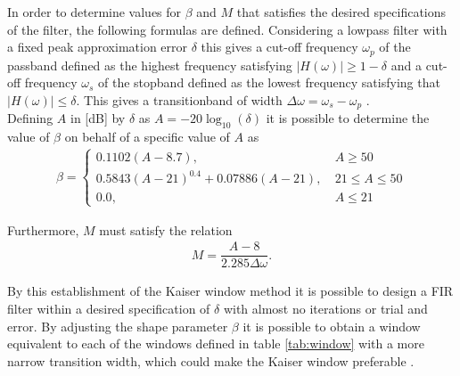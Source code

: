 In order to determine values for $\beta$ and $M$ that satisfies the desired specifications of the filter, the following formulas are defined. Considering a lowpass filter with a fixed peak approximation error $\delta$ this gives a cut-off frequency $\omega_p$ of the passband defined as the highest frequency satisfying $|H(\omega)| \geq 1-\delta$ and a cut-off frequency $\omega_s$ of the stopband defined as the lowest frequency satisfying that $|H(\omega)| \leq \delta$. This gives a transitionband of width $\Delta \omega = \omega_s - \omega_p$ . \\
Defining $A$ in [dB] by $\delta$ as $A = -20\log_{10} (\delta)$ it is possible to determine the value of $\beta$ on behalf of a specific value of $A$ as \cite{page 566, DTSP}
\begin{align}
\beta =
\left\{ \begin{matrix}
0.1102\left( A-8.7 \right), &\ A \geq 50 \\
0.5843\left(A-21\right)^{0.4}+0.07886(A-21), &\ 21 \leq A \leq 50 \\
0.0, &\  A \leq 21 
\end{matrix}\right.
\end{align}
       
Furthermore, $M$ must satisfy the relation
\begin{align}
M = \dfrac{A-8}{2.285\Delta \omega}.
\end{align}

By this establishment of the Kaiser window method it is possible to design a FIR filter within a desired specification of $\delta$ with almost no iterations or trial and error. By adjusting the shape parameter $\beta$ it is possible to obtain a window equivalent to each of the windows defined in table \ref{tab:window} with a more narrow transition width, which could make the Kaiser window preferable .       
   
